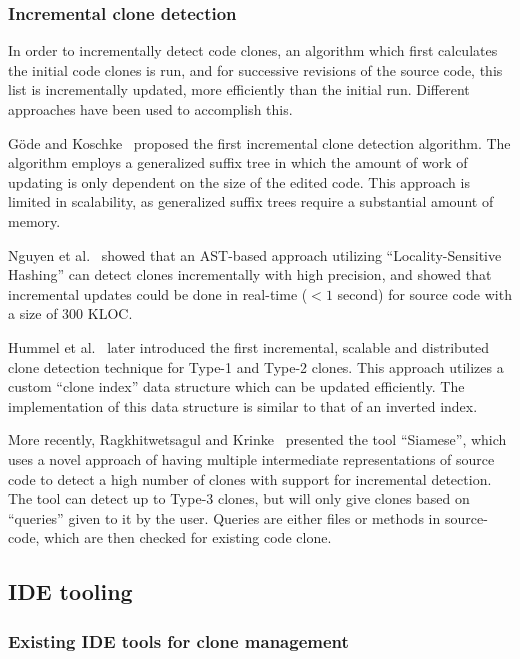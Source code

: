 \subsubsection{Incremental clone detection}

In order to incrementally detect code clones, an algorithm which first calculates the
initial code clones is run, and for successive revisions of the source code, this list is
incrementally updated, more efficiently than the initial run. Different approaches have
been used to accomplish this.

Göde and Koschke~\cite{GodeIncrementalCloneDetection} proposed the first incremental clone
detection algorithm. The algorithm employs a generalized suffix tree in which the amount
of work of updating is only dependent on the size of the edited code. This approach is
limited in scalability, as generalized suffix trees require a substantial amount of
memory.

Nguyen et al.~\cite{LocalitySensitiveHashingIncremental} showed that an AST-based approach
utilizing ``Locality-Sensitive Hashing'' can detect clones incrementally with high
precision, and showed that incremental updates could be done in real-time ($< 1$ second)
for source code with a size of 300 KLOC.

Hummel et al.~\cite{IndexBasedIncrementalCloneDetection} later introduced the first incremental,
scalable and distributed clone detection technique for Type-1 and Type-2 clones. This
approach utilizes a custom ``clone index'' data structure which can be updated
efficiently. The implementation of this data structure is similar to that of an inverted
index.


More recently, Ragkhitwetsagul and Krinke~\cite{SiameseScalableAndIncrementalClone}
presented the tool ``Siamese'', which uses a novel approach of having multiple
intermediate representations of source code to detect a high number of clones with
support for incremental detection. The tool can detect up to Type-3 clones, but will only
give clones based on ``queries'' given to it by the user. Queries are either files or
methods in source-code, which are then checked for existing code clone.

\subsection{IDE tooling}

\subsubsection{Existing IDE tools for clone management}

